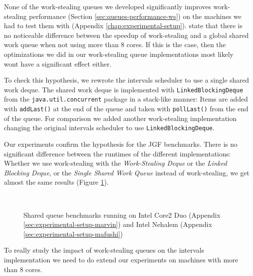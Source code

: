 None of the work-stealing queues we developed significantly improves
work-stealing performance (Section \ref{sec:queues-performance-ws}) on
the machines we had to test them with (Appendix
\ref{chap:experimental-setup}). \textcite{Saha2007} state that there
is no noticeable difference between the speedup of work-stealing and a
global shared work queue when not using more than 8 cores. If this is
the case, then the optimizations we did in our work-stealing queue
implementations most likely wont have a significant effect either.

To check this hypothesis, we rewrote the intervals scheduler to use a
single shared work deque. The shared work deque is implemented with
\lstinline!LinkedBlockingDeque! from the
\lstinline!java.util.concurrent! package in a stack-like manner: Items
are added with \lstinline!addLast()! at the end of the queue and taken
with \lstinline!pollLast()! from the end of the queue. For comparison
we added another work-stealing implementation changing the original
intervals scheduler to use \lstinline!LinkedBlockingDeque!.

Our experiments confirm the hypothesis for the JGF benchmarks. There
is no significant difference between the runtimes of the different
implementations: Whether we use work-stealing with the
\emph{Work-Stealing Deque} or the \emph{Linked Blocking Deque}, or the
\emph{Single Shared Work Queue} instead of work-stealing, we get
almost the same results (Figure
\ref{fig:queues-performance-shared-queue}).

\begin{figure}[!ht]
  \centering
  \\
  \caption[Single shared work queue benchmark results]{Shared queue
    benchmarks running on Intel Core2 Duo (Appendix
    \ref{sec:experimental-setup-marvin}) and Intel Nehalem (Appendix
    \ref{sec:experimental-setup-mafushi})}
  \label{fig:queues-performance-shared-queue}
\end{figure}

To really study the impact of work-stealing queues on the intervals
implementation we need to do extend our experiments on machines with
more than 8 cores.


